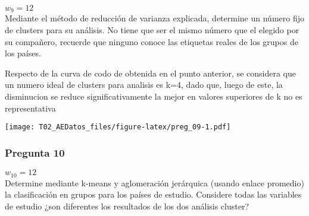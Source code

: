 \documentclass[
]{article}
\newenvironment{Shaded}{\begin{snugshade}}{\end{snugshade}}
\newcommand{\AttributeTok}[1]{\textcolor[rgb]{0.13,0.29,0.53}{#1}}
\newcommand{\CommentTok}[1]{\textcolor[rgb]{0.56,0.35,0.01}{\textit{#1}}}
\newcommand{\ControlFlowTok}[1]{\textcolor[rgb]{0.13,0.29,0.53}{\textbf{#1}}}
\newcommand{\DecValTok}[1]{\textcolor[rgb]{0.00,0.00,0.81}{#1}}
\newcommand{\FunctionTok}[1]{\textcolor[rgb]{0.13,0.29,0.53}{\textbf{#1}}}
\newcommand{\NormalTok}[1]{#1}
\newcommand{\OtherTok}[1]{\textcolor[rgb]{0.56,0.35,0.01}{#1}}
\newcommand{\SpecialCharTok}[1]{\textcolor[rgb]{0.81,0.36,0.00}{\textbf{#1}}}
\newcommand{\StringTok}[1]{\textcolor[rgb]{0.31,0.60,0.02}{#1}}
\begin{document}
\(w_9=12\)\\
Mediante el método de reducción de varianza explicada, determine un
número fijo de clusters para su análisis. No tiene que ser el mismo
número que el elegido por su compañero, recuerde que ninguno conoce las
etiquetas reales de los grupos de los países.

Respecto de la curva de codo de obtenida en el punto anterior, se
considera que un numero ideal de clusters para analisis es k=4, dado
que, luego de este, la disminucion se reduce significativamente la mejor
en valores superiores de k no es representativa

\begin{Shaded}
\end{Shaded}

\texttt{[image: T02\_AEDatos\_files/figure-latex/preg\_09-1.pdf]}

\subsubsection{Pregunta 10}\label{pregunta-10}

\(w_{10}=12\)\\
Determine mediante k-means y aglomeración jerárquica (usando enlace
promedio) la clasificación en grupos para los países de estudio.
Considere todas las variables de estudio ¿son diferentes los resultados
de los dos análisis cluster?
\end{document}
